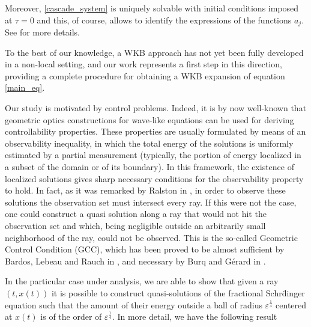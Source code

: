 \documentclass[10pt]{article}
\begin{document}
Moreover, \eqref{cascade_system} is uniquely solvable with initial conditions imposed at $\tau = 0$ and this, of course, allows to identify the expressions of the functions $a_j$. See \cite{biccari2018wkb} for more details.

To the best of our knowledge, a WKB approach has not yet been fully developed in a non-local setting, and our work represents a first step in this direction, providing a complete procedure for obtaining a WKB expansion of equation \eqref{main_eq}. 

Our study is motivated by control problems. Indeed, it is by now well-known that geometric optics constructions for wave-like equations can be used for deriving controllability properties. These properties are usually formulated by means of an observability inequality, in which the total energy of the solutions is uniformly estimated by a partial measurement (typically, the portion of energy localized in a subset of the domain or of its boundary). In this framework, the existence of localized solutions gives sharp necessary conditions for the observability property to hold. In fact, as it was remarked by Ralston in \cite{ralston1982gaussian}, in order to observe these solutions the observation set must intersect every ray. If this were not the case, one could construct a quasi solution along a ray that would not hit the observation set and which, being negligible outside an arbitrarily small neighborhood of the ray, could not be observed. This is the so-called Geometric Control Condition (GCC), which has been proved to be almost sufficient by Bardos, Lebeau and Rauch in \cite{bardos1992sharp}, and necessary by Burq and Gérard in \cite{burq1997condition}.

In the particular case under analysis, we are able to show that given a ray $(t,x(t))$ it is possible to construct quasi-solutions of the fractional Schr\"dinger equation such that the amount of their energy outside a ball of radius $\varepsilon^{\frac 14}$ centered at $x(t)$ is of the order of $\varepsilon^{\frac 14}$. In more detail, we have the following result
\end{document}
